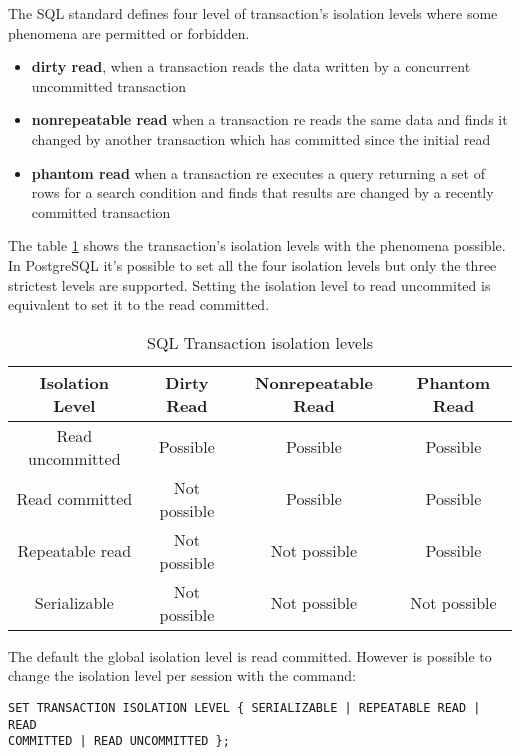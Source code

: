 The SQL standard defines four level of transaction's isolation levels where 
some phenomena are permitted or forbidden.

\begin{itemize}
 \item \textbf{dirty read}, when a transaction reads the data written by a concurrent 
uncommitted transaction

\item \textbf{nonrepeatable read} when a transaction re reads the same data and finds it changed by
another transaction which has committed since the initial read

\item \textbf{phantom read} when a transaction re executes a query returning a set 
of rows for a search condition and finds that results are changed by a recently committed 
transaction

\end{itemize}

The table \ref{tab:TRNISOLATION} shows the transaction's isolation levels with the phenomena
possible. In PostgreSQL it's possible to set all the four isolation levels but only the three
strictest levels are supported. Setting the  isolation level to read uncommited is
equivalent to set it to the read committed.

\begin{table}[H]
  \begin{tabular}{cccc}
    Isolation Level & Dirty Read    &    Nonrepeatable Read   &   Phantom 
Read\\ 
    \hline
    Read uncommitted  &  Possible    &    Possible     &   Possible\\
    Read committed    &  Not possible &  Possible     &   Possible\\
    Repeatable read   &  Not possible  & Not possible  &  Possible\\
    Serializable      &  Not possible  & Not possible   & Not possible\\
  \end{tabular}
  \caption{\label{tab:TRNISOLATION}SQL Transaction isolation levels}
\end{table}

The default the global isolation level is read committed. However is possible to change the
isolation level per session with the command:
\begin{lstlisting}[style=pgsql]
SET TRANSACTION ISOLATION LEVEL { SERIALIZABLE | REPEATABLE READ | READ 
COMMITTED | READ UNCOMMITTED }; 
\end{lstlisting}


